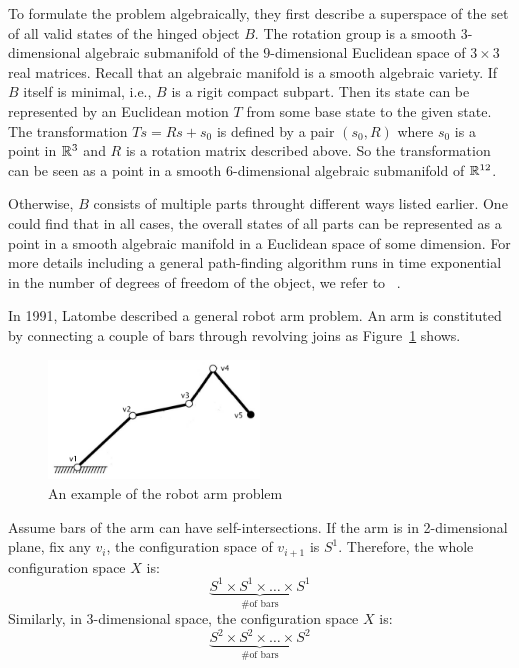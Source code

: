 To formulate the problem algebraically, they first describe a superspace of the set of all valid states of the hinged object \(B\).
The rotation group is a smooth \(3\)-dimensional algebraic submanifold of the \(9\)-dimensional Euclidean space of \(3\times 3\) real matrices.
Recall that an algebraic manifold is a smooth algebraic variety.
If \(B\) itself is minimal, i.e., \(B\) is a rigit compact subpart. Then its state can be represented by an Euclidean motion \(T\) from some base state to the given state.
The transformation \(Ts=Rs+s_0\) is defined by a pair \((s_0, R)\) where \(s_0\) is a point in \(\mathbb{R}^3\) and \(R\) is a rotation matrix described above.
So the transformation can be seen as a point in a smooth \(6\)-dimensional algebraic submanifold of \(\mathbb{R}^{12}\).

Otherwise, \(B\) consists of multiple parts throught different ways listed earlier. One could find that in all cases, the overall states of all parts can be represented as a point in a smooth algebraic manifold in a Euclidean space of some dimension. For more details including a general path-finding algorithm runs in time exponential in the number of degrees of freedom of the object, we refer to ~\cite{schwartz1983piano}.

\begin{example}
  In 1991, Latombe described a general robot arm problem. An arm is constituted by connecting a couple of bars through revolving joins as Figure~\ref{fig:arm} shows.
  \begin{figure}
    \begin{center}
      \includegraphics[width=0.5\textwidth]{fig-arm}
    \end{center}
    \caption{An example of the robot arm problem}
    \label{fig:arm}
  \end{figure}
\end{example}
Assume bars of the arm can have self-intersections. If the arm is in 2-dimensional plane, fix any \(v_i\), the configuration space of \(v_{i+1}\) is \(S^1\). Therefore, the whole configuration space \(X\) is:
\[\underbrace{S^1\times S^1\times\dots\times S^1}_{\text{\# of bars}}\]
Similarly, in 3-dimensional space, the configuration space \(X\) is:
\[\underbrace{S^2\times S^2\times\dots\times S^2}_{\text{\# of bars}}\]

